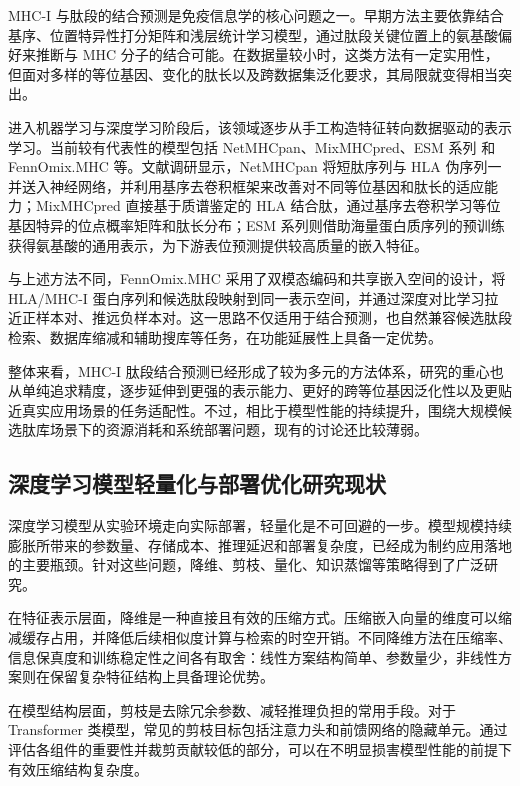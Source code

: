 MHC-I 与肽段的结合预测是免疫信息学的核心问题之一。早期方法主要依靠结合基序、位置特异性打分矩阵和浅层统计学习模型，通过肽段关键位置上的氨基酸偏好来推断与 MHC 分子的结合可能\cite{peters2005generating}。在数据量较小时，这类方法有一定实用性，但面对多样的等位基因、变化的肽长以及跨数据集泛化要求，其局限就变得相当突出。

进入机器学习与深度学习阶段后，该领域逐步从手工构造特征转向数据驱动的表示学习。当前较有代表性的模型包括 NetMHCpan\cite{reynisson2020netmhcpan}、MixMHCpred\cite{gfeller2023mixmhcpred}、ESM 系列\cite{rives2021biological} 和 FennOmix.MHC 等。文献调研显示，NetMHCpan 将短肽序列与 HLA 伪序列一并送入神经网络，并利用基序去卷积框架来改善对不同等位基因和肽长的适应能力；MixMHCpred 直接基于质谱鉴定的 HLA 结合肽，通过基序去卷积学习等位基因特异的位点概率矩阵和肽长分布；ESM 系列则借助海量蛋白质序列的预训练获得氨基酸的通用表示，为下游表位预测提供较高质量的嵌入特征。

与上述方法不同，FennOmix.MHC 采用了双模态编码和共享嵌入空间的设计，将 HLA/MHC-I 蛋白序列和候选肽段映射到同一表示空间，并通过深度对比学习拉近正样本对、推远负样本对。这一思路不仅适用于结合预测，也自然兼容候选肽段检索、数据库缩减和辅助搜库等任务，在功能延展性上具备一定优势。

整体来看，MHC-I 肽段结合预测已经形成了较为多元的方法体系，研究的重心也从单纯追求精度，逐步延伸到更强的表示能力、更好的跨等位基因泛化性以及更贴近真实应用场景的任务适配性\cite{reynisson2020netmhcpan,gfeller2023improved,abelin2024innovations}。不过，相比于模型性能的持续提升，围绕大规模候选肽库场景下的资源消耗和系统部署问题，现有的讨论还比较薄弱。

\subsection{深度学习模型轻量化与部署优化研究现状}

深度学习模型从实验环境走向实际部署，轻量化是不可回避的一步。模型规模持续膨胀所带来的参数量、存储成本、推理延迟和部署复杂度，已经成为制约应用落地的主要瓶颈。针对这些问题，降维、剪枝、量化、知识蒸馏等策略得到了广泛研究\cite{li2023model,cheng2024survey}。

在特征表示层面，降维是一种直接且有效的压缩方式。压缩嵌入向量的维度可以缩减缓存占用，并降低后续相似度计算与检索的时空开销。不同降维方法在压缩率、信息保真度和训练稳定性之间各有取舍：线性方案结构简单、参数量少，非线性方案则在保留复杂特征结构上具备理论优势\cite{sorzano2014survey,wang2016autoencoder}。

在模型结构层面，剪枝是去除冗余参数、减轻推理负担的常用手段。对于 Transformer 类模型，常见的剪枝目标包括注意力头和前馈网络的隐藏单元。通过评估各组件的重要性并裁剪贡献较低的部分，可以在不明显损害模型性能的前提下有效压缩结构复杂度\cite{michel2019sixteen,lagunas2021block}。

